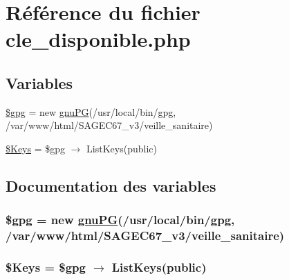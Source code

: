 \hypertarget{cle__disponible_8php}{
\section{R\'{e}f\'{e}rence du fichier cle\_\-disponible.php}
\label{cle__disponible_8php}
}
\subsection*{Variables}
\begin{CompactItemize}
\item 
\hyperlink{cle__disponible_8php_a0}{\$gpg} = new \hyperlink{classgnuPG}{gnu\-PG}(/usr/local/bin/gpg, /var/www/html/SAGEC67\_\-v3/veille\_\-sanitaire)
\item 
\hyperlink{cle__disponible_8php_a1}{\$Keys} = \$gpg $\rightarrow$ List\-Keys(public)
\end{CompactItemize}


\subsection{Documentation des variables}
\hypertarget{cle__disponible_8php_a0}{
\subsubsection[\$gpg]{\setlength{\rightskip}{0pt plus 5cm}\$gpg = new \hyperlink{classgnuPG}{gnu\-PG}(/usr/local/bin/gpg, /var/www/html/SAGEC67\_\-v3/veille\_\-sanitaire)}}
\label{cle__disponible_8php_a0}


\hypertarget{cle__disponible_8php_a1}{
\subsubsection[\$Keys]{\setlength{\rightskip}{0pt plus 5cm}\$Keys = \$gpg $\rightarrow$ List\-Keys(public)}}
\label{cle__disponible_8php_a1}


